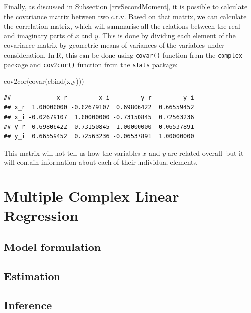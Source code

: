 \documentclass[
]{book}
\newenvironment{Shaded}{\begin{snugshade}}{\end{snugshade}}
\newcommand{\FunctionTok}[1]{\textcolor[rgb]{0.00,0.00,0.00}{#1}}
\newcommand{\NormalTok}[1]{#1}
\begin{document}
Finally, as discussed in Subsection \ref{crvSecondMoment}, it is possible to calculate the covariance matrix between two c.r.v. Based on that matrix, we can calculate the correlation matrix, which will summarise all the relations between the real and imaginary parts of \(x\) and \(y\). This is done by dividing each element of the covariance matrix by geometric means of variances of the variables under consideration. In R, this can be done using \texttt{covar()} function from the \texttt{complex} package and \texttt{cov2cor()} function from the \texttt{stats} package:

\begin{Shaded}
\begin{Highlighting}[]
\FunctionTok{cov2cor}\NormalTok{(}\FunctionTok{covar}\NormalTok{(}\FunctionTok{cbind}\NormalTok{(x,y)))}
\end{Highlighting}
\end{Shaded}

\begin{verbatim}
##             x_r         x_i         y_r         y_i
## x_r  1.00000000 -0.02679107  0.69806422  0.66559452
## x_i -0.02679107  1.00000000 -0.73150845  0.72563236
## y_r  0.69806422 -0.73150845  1.00000000 -0.06537891
## y_i  0.66559452  0.72563236 -0.06537891  1.00000000
\end{verbatim}

This matrix will not tell us how the variables \(x\) and \(y\) are related overall, but it will contain information about each of their individual elements.

\hypertarget{multipleCLR}{%
\chapter{Multiple Complex Linear Regression}\label{multipleCLR}}

\hypertarget{model-formulation-1}{%
\section{Model formulation}\label{model-formulation-1}}

\hypertarget{estimation}{%
\section{Estimation}\label{estimation}}

\hypertarget{inference}{%
\section{Inference}\label{inference}}
\end{document}
